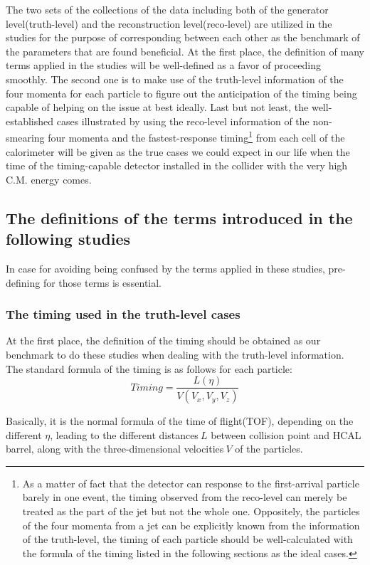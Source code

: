 The two sets of the collections of the data including both of the generator level(truth-level) and the reconstruction level(reco-level) are utilized in the studies for the purpose of corresponding between each other as the benchmark of the parameters that are found beneficial. At the first place, the definition of many terms applied in the studies will be well-defined as a favor of proceeding smoothly. The second one is to make use of the truth-level information of the four momenta for each particle to figure out the anticipation of the timing being capable of helping on the issue at best ideally. Last but not least, the well-established cases illustrated by using the reco-level information of the non-smearing four momenta and the fastest-response timing\footnote{As a matter of fact that the detector can response to the first-arrival particle barely in one event, the timing observed from the reco-level can merely be treated as the part of the jet but not the whole one. Oppositely, the particles of the four momenta from a jet can be explicitly known from the information of the truth-level, the timing of each particle should be well-calculated with the formula of the timing listed in the following sections as the ideal cases.} from each cell of the calorimeter will be given as the true cases we could expect in our life when the time of the timing-capable detector installed in the collider with the very high C.M. energy comes.\\

\subsection{The definitions of the terms introduced in the following studies}
\label{sec:Def_timing}
In case for avoiding being confused by the terms applied in these studies, pre-defining for those terms is essential.\\
\subsubsection{The timing used in the truth-level cases}
At the first place, the definition of the timing should be obtained as our benchmark to do these studies when dealing with the truth-level information. The standard formula of the timing is as follows for each particle:
\begin{equation}
 Timing = \frac{L(\eta)}{V(V_{x},V_{y},V_{z})}  
\end{equation}

Basically, it is the normal formula of the time of flight(TOF), depending on the different \(\eta\), leading to the different distances\(\ L\) between collision point and HCAL barrel, along with the three-dimensional velocities\(\ V \) of the particles.\\

